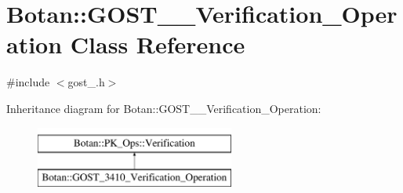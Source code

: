 \hypertarget{classBotan_1_1GOST__3410__Verification__Operation}{\section{Botan\-:\-:G\-O\-S\-T\-\_\-\_\-\-Verification\-\_\-\-Operation Class Reference}
\label{classBotan_1_1GOST__3410__Verification__Operation}
}


{\ttfamily \#include $<$gost\-\_.\-h$>$}

Inheritance diagram for Botan\-:\-:G\-O\-S\-T\-\_\-\_\-\-Verification\-\_\-\-Operation\-:\begin{figure}[H]
\begin{center}
\leavevmode
\includegraphics[height=2.000000cm]{classBotan_1_1GOST__3410__Verification__Operation}
\end{center}
\end{figure}
